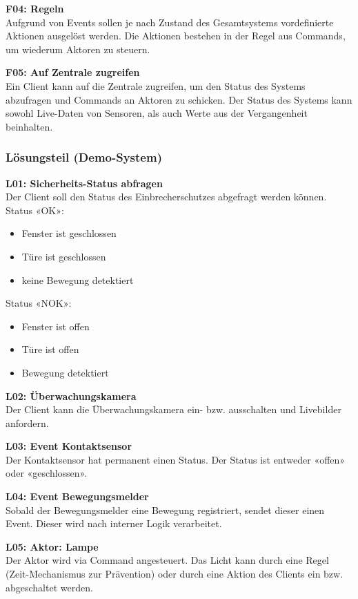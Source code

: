 \textbf{F04: Regeln} \\
Aufgrund von Events sollen je nach Zustand des Gesamtsystems vordefinierte Aktionen ausgelöst werden. Die Aktionen bestehen in der Regel aus Commands, um wiederum Aktoren zu steuern.

\textbf{F05: Auf Zentrale zugreifen} \\
Ein Client kann auf die Zentrale zugreifen, um den Status des Systems abzufragen und Commands an Aktoren zu schicken. Der Status des Systems kann sowohl Live-Daten von Sensoren, als auch Werte aus der Vergangenheit beinhalten.

\subsubsection{Lösungsteil (Demo-System)}


\textbf{L01: Sicherheits-Status abfragen} \\
Der Client soll den Status des Einbrecherschutzes abgefragt werden können. \\
Status «OK»:
\begin{itemize}
	\item Fenster ist geschlossen
	\item Türe ist geschlossen
	\item keine Bewegung detektiert
\end{itemize}
Status «NOK»:
\begin{itemize}
	\item Fenster ist offen
	\item Türe ist offen
	\item Bewegung detektiert
\end{itemize}

\textbf{L02: Überwachungskamera} \\
Der Client kann die Überwachungskamera ein- bzw. ausschalten und Livebilder anfordern.

\textbf{L03: Event Kontaktsensor} \\
Der Kontaktsensor hat permanent einen Status. Der Status ist entweder «offen» oder «geschlossen».

\textbf{L04: Event Bewegungsmelder} \\
Sobald der Bewegungsmelder eine Bewegung registriert, sendet dieser einen Event. Dieser wird nach interner Logik verarbeitet.

\textbf{L05: Aktor: Lampe} \\
Der Aktor wird via Command angesteuert. Das Licht kann durch eine Regel (Zeit-Mechanismus zur Prävention) oder durch eine Aktion des Clients ein bzw. abgeschaltet werden.

